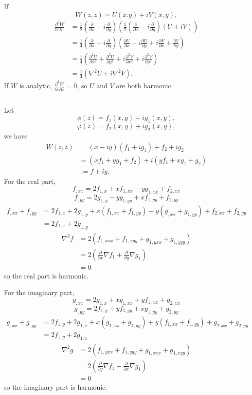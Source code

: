 \documentclass[12pt]{article}
\newcommand{\pr}{{\partial}}
\begin{document}
\subsection{}
If
\[
W(z,\bar z) = U(x.y) + iV(x,y),
\]
\begin{align*}
  \frac{\pr^2 W}{\pr z\pr \bar z} &= \frac 1 2 (\frac{\pr}{\pr x} + i\frac{\pr}{\pr y}) (\frac 1 2 (\frac{\pr}{\pr x} - i\frac{\pr}{\pr y})(U + iV) )\\
  &=\frac 1 4 (\frac{\pr}{\pr x} + i\frac{\pr}{\pr y})(\frac{\pr U}{\pr x} - i\frac{\pr U}{\pr y} + i\frac{\pr V}{\pr x} +\frac{\pr V}{\pr y})\\
  &=\frac 1 4(\frac{\pr^2 U}{\pr x^2} + \frac{\pr^2 U}{\pr y^2} + i  \frac{\pr^2 V}{\pr x^2} + i \frac{\pr^2 V}{\pr y^2})\\
  &=\frac 1 4 (\nabla^2 U + i\nabla^2 V).
\end{align*}
If $W$ is analytic, $\frac{\pr^2 W}{\pr z\pr \bar z}  =0$, so $U$ and $V$ are both harmonic.



\subsection{}
Let
\[
\phi(z) = f_1(x,y) + ig_1(x,y), 
\]
\[
\varphi(z) = f_2(x,y) + ig_2(x,y), 
\]
we have
\begin{align*}
  W(z,\bar z) &= (x-iy)(f_1 + ig_1) +f_2 + ig_2\\
  &= (xf_1 + yg_1 + f_2)+ i (yf_1 +xg_1 + g_2) \\
  &:= f + ig.
\end{align*}
For the real part,
\[
f_{,xx} = 2f_{1,x} +xf_{1,xx}-yg_{1,xx} + f_{2,xx}
\]
\[
f_{,yy} = 2g_{1,y} -yg_{1,yy}+xf_{1,yy} + f_{2,yy}
\]
\begin{align*}
  f_{,xx} + f_{,yy} &=  2f_{1,x}+2g_{1,y} + x(f_{1,xx} + f_{1,yy}) - y(g_{,xx} + g_{1,yy} )+f_{2,xx} + f_{2,yy}\\
  &= 2f_{1,x}+2g_{1,y} 
\end{align*}
\begin{align*}
  \nabla^2 f &= 2(f_{1,xxx} + f_{1,xyy} + g_{1,yxx} + g_{1,yyy})\\
  &=2(\frac{\pr}{\pr x}\nabla f_1 + \frac{\pr}{\pr y}\nabla g_1)\\
  &=0
\end{align*}
so the real part is harmonic.


For the imaginary part,
\[
g_{,xx} = 2g_{1,x} +xg_{1,xx}+yf_{1,xx} + g_{2,xx}
\]
\[
g_{,yy} = 2f_{1,y} +yf_{1,yy}+xg_{1,yy} + g_{2,yy}
\]
\begin{align*}
  g_{,xx} + g_{,yy} &=  2f_{1,y}+2g_{1,x} + x(g_{1,xx} + g_{1,yy}) + y(f_{1,xx} + f_{1,yy} )+g_{2,xx} + g_{2,yy}\\
  &= 2f_{1,y}+2g_{1,x} 
\end{align*}
\begin{align*}
  \nabla^2 g &= 2(f_{1,yxx} + f_{1,yyy} + g_{1,xxx} + g_{1,xyy})\\
  &=2(\frac{\pr}{\pr y}\nabla f_1 + \frac{\pr}{\pr x}\nabla g_1)\\
  &=0
\end{align*}
so the imaginary part is harmonic.
\end{document}
